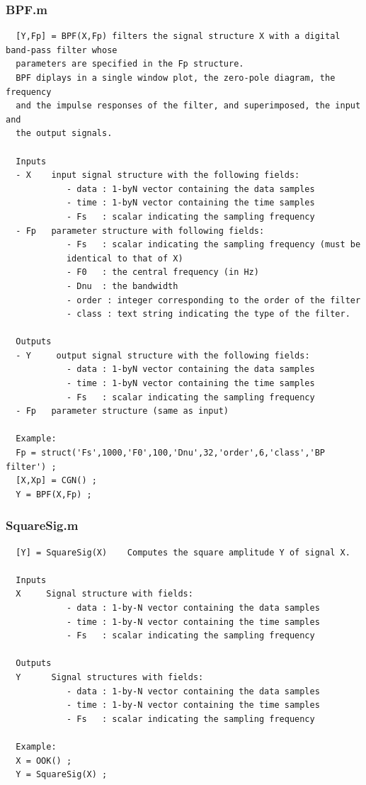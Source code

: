\documentclass{article}
\begin{document}
\subsubsection{BPF.m}


        \color{lightgray} \begin{verbatim}  [Y,Fp] = BPF(X,Fp) filters the signal structure X with a digital band-pass filter whose 
  parameters are specified in the Fp structure.
  BPF diplays in a single window plot, the zero-pole diagram, the frequency 
  and the impulse responses of the filter, and superimposed, the input and
  the output signals.
 
  Inputs
  - X    input signal structure with the following fields:
            - data : 1-byN vector containing the data samples
            - time : 1-byN vector containing the time samples
            - Fs   : scalar indicating the sampling frequency
  - Fp   parameter structure with following fields:
            - Fs   : scalar indicating the sampling frequency (must be
            identical to that of X)
            - F0   : the central frequency (in Hz)
            - Dnu  : the bandwidth 
            - order : integer corresponding to the order of the filter 
            - class : text string indicating the type of the filter.
 
  Outputs
  - Y     output signal structure with the following fields:
            - data : 1-byN vector containing the data samples
            - time : 1-byN vector containing the time samples
            - Fs   : scalar indicating the sampling frequency
  - Fp   parameter structure (same as input)
 
  Example:
  Fp = struct('Fs',1000,'F0',100,'Dnu',32,'order',6,'class','BP filter') ;  
  [X,Xp] = CGN() ;
  Y = BPF(X,Fp) ;
\end{verbatim} \color{black}



\subsubsection{SquareSig.m}

        \color{black} \begin{verbatim}  [Y] = SquareSig(X)    Computes the square amplitude Y of signal X.
 
  Inputs
  X     Signal structure with fields:
            - data : 1-by-N vector containing the data samples
            - time : 1-by-N vector containing the time samples
            - Fs   : scalar indicating the sampling frequency
 
  Outputs
  Y      Signal structures with fields:
            - data : 1-by-N vector containing the data samples
            - time : 1-by-N vector containing the time samples
            - Fs   : scalar indicating the sampling frequency
 
  Example:
  X = OOK() ;
  Y = SquareSig(X) ;
\end{verbatim} \color{black}
    
\end{document}
